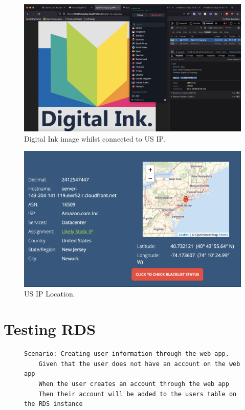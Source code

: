 \begin{figure}[!htbp]
    \centering
    \includegraphics[width=\textwidth]{resources/cloudfront/cloudfront-test-us}
    \caption{Digital Ink image whilst connected to US IP.}
    \label{fig:cloudfront-test-us}
\end{figure}

\begin{figure}[!htbp]
    \centering
    \includegraphics[width=\textwidth]{resources/cloudfront/cloudfront-test-us-ip}
    \caption{US IP Location.}
    \label{fig:cloudfront-test-us-ip}
\end{figure}

\clearpage

\section{Testing RDS}\label{sec:testing-rds}

\begin{figure}[!htbp]
    \centering
    \begin{verbatim}
Scenario: Creating user information through the web app.
    Given that the user does not have an account on the web app
    When the user creates an account through the web app
    Then their account will be added to the users table on the RDS instance
    \end{verbatim}
    \label{fig:create-user-data}
\end{figure}


